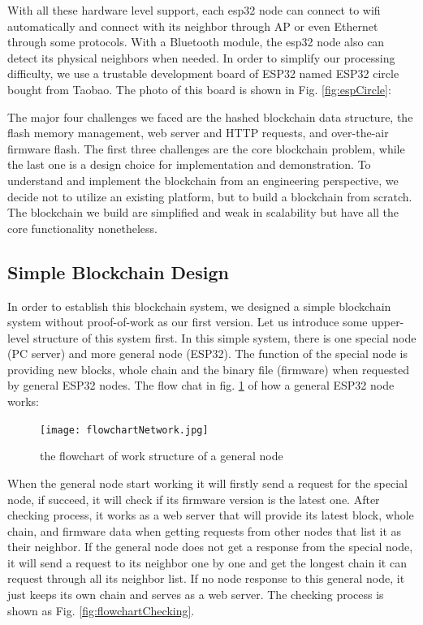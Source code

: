 \documentclass{article}
\begin{document}
    With all these hardware level support, each esp32 node can connect to wifi automatically and connect with its neighbor through AP or even Ethernet through some protocols. With a Bluetooth module, the esp32 node also can detect its physical neighbors when needed. In order to simplify our processing difficulty, we use a trustable development board of ESP32 named ESP32 circle bought from Taobao. \citep{whyengineer} The photo of this board is shown in Fig.  \ref{fig:espCircle}:

    The major four challenges we faced are the hashed blockchain data structure, the flash memory management, web server and HTTP requests, and over-the-air firmware flash. The first three challenges are the core blockchain problem, while the last one is a design choice for implementation and demonstration. To understand and implement the blockchain from an engineering perspective, we decide not to utilize an existing platform, but to build a blockchain from scratch. The blockchain we build are simplified and weak in scalability but have all the core functionality nonetheless.

    \subsection{Simple Blockchain Design}
        In order to establish this blockchain system, we designed a simple blockchain system without proof-of-work as our first version.
        Let us introduce some upper-level structure of this system first. In this simple system, there is one special node (PC server) and more general node (ESP32). The function of the special node is providing new blocks, whole chain and the binary file (firmware) when requested by general ESP32 nodes.
        The flow chat in fig. \ref{fig:flowchart} of how a general ESP32 node works:

        \begin{figure}[h]
          \centering
          \texttt{[image: flowchartNetwork.jpg]}
          \caption{the flowchart of work structure of a general node}
          \label{fig:flowchart}
        \end{figure}

        When the general node start working it will firstly send a request for the special node, if succeed, it will check if its firmware version is the latest one. After checking process, it works as a web server that will provide its latest block, whole chain, and firmware data when getting requests from other nodes that list it as their neighbor. If the general node does not get a response from the special node, it will send a request to its neighbor one by one and get the longest chain it can request through all its neighbor list. If no node response to this general node, it just keeps its own chain and serves as a web server.
        The checking process is shown as Fig. \ref{fig:flowchartChecking}.
\end{document}
